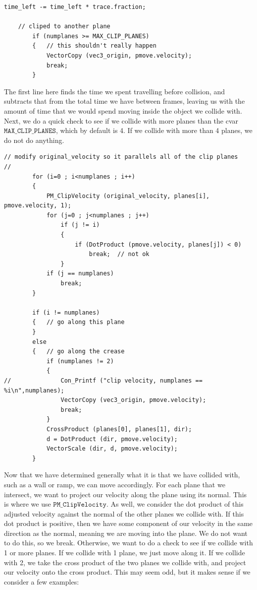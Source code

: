 \documentclass{article}
\begin{document}
\begin{verbatim}
time_left -= time_left * trace.fraction;
		
	// cliped to another plane
		if (numplanes >= MAX_CLIP_PLANES)
		{	// this shouldn't really happen
			VectorCopy (vec3_origin, pmove.velocity);
			break;
		}
\end{verbatim}
The first line here finds the time we spent travelling before collision, and subtracts that from the total time we have between frames, leaving us with the amount of time that we would spend moving inside the object we collide with. Next, we do a quick check to see if we collide with more planes than the cvar $\texttt{MAX\_CLIP\_PLANES}$, which by default is 4. If we collide with more than 4 planes, we do not do anything.
\begin{verbatim}
// modify original_velocity so it parallels all of the clip planes
//
		for (i=0 ; i<numplanes ; i++)
		{
			PM_ClipVelocity (original_velocity, planes[i], pmove.velocity, 1);
			for (j=0 ; j<numplanes ; j++)
				if (j != i)
				{
					if (DotProduct (pmove.velocity, planes[j]) < 0)
						break;	// not ok
				}
			if (j == numplanes)
				break;
		}
		
		if (i != numplanes)
		{	// go along this plane
		}
		else
		{	// go along the crease
			if (numplanes != 2)
			{
//				Con_Printf ("clip velocity, numplanes == %i\n",numplanes);
				VectorCopy (vec3_origin, pmove.velocity);
				break;
			}
			CrossProduct (planes[0], planes[1], dir);
			d = DotProduct (dir, pmove.velocity);
			VectorScale (dir, d, pmove.velocity);
		}
\end{verbatim}
Now that we have determined generally what it is that we have collided with, such as a wall or ramp, we can move accordingly. For each plane that we intersect, we want to project our velocity along the plane using its normal. This is where we use $\texttt{PM\_ClipVelocity}$. As well, we consider the dot product of this adjusted velocity against the normal of the other planes we collide with. If this dot product is positive, then we have some component of our velocity in the same direction as the normal, meaning we are moving into the plane. We do not want to do this, so we break. Otherwise, we want to do a check to see if we collide with 1 or more planes. If we collide with 1 plane, we just move along it. If we collide with 2, we take the cross product of the two planes we collide with, and project our velocity onto the cross product.
This may seem odd, but it makes sense if we consider a few examples:
\end{document}
